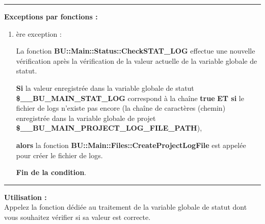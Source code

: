 \documentclass[a4paper,10pt]{article}
\begin{document}

\par\noindent\rule{\textwidth}{0.4pt}

\begin{justify}
    \textbf{Exceptions par fonctions :}
\end{justify}

\begin{justify}
    \begin{enumerate}
        \item
        {
            ère exception :

            \begin{justify}
                La fonction \textbf{\color{mauve}BU::Main::Status::CheckSTAT\_LOG} effectue une nouvelle vérification après la vérification de la valeur actuelle de la variable globale de statut.
            \end{justify}

            \begin{justify}
                \textbf{\color{brick}Si} la valeur enregistrée dans la variable globale de statut \textbf{\color{orange}\$\_\_BU\_MAIN\_STAT\_LOG} correspond à la chaîne \textbf{true} \textbf{\color{brick}ET si} le fichier de logs n'existe pas encore (la chaîne de caractères (chemin) enregistrée dans la variable globale de projet \textbf{\color{orange}\$\_\_BU\_MAIN\_PROJECT\_LOG\_FILE\_PATH}),
            \end{justify}

            \begin{justify}
                \textbf{\color{brick} alors} la fonction \textbf{\color{mauve}BU::Main::Files::CreateProjectLogFile} est appelée pour créer le fichier de logs.
            \end{justify}

            \begin{justify}
                \textbf{\color{brick}Fin de la condition}.
            \end{justify}
        }
    \end{enumerate}
\end{justify}


\par\noindent\rule{\textwidth}{0.4pt}

\begin{justify}
    \textbf{Utilisation :}\\[1\baselineskip]
    Appelez la fonction dédiée au traitement de la variable globale de statut dont vous souhaitez vérifier si sa valeur est correcte.
\end{justify}
\end{document}
